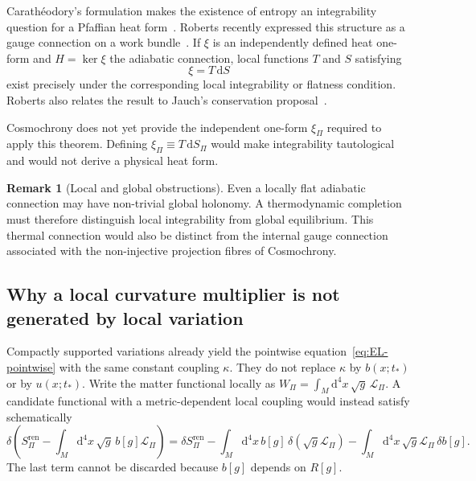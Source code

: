 \documentclass[12pt,a4paper]{article}
\theoremstyle{definition}
\newtheorem{remark}[theorem]{Remark}
\newcommand{\Spi}{S_{\Pi}}
\newcommand{\dd}{\mathrm{d}}
\begin{document}
      Carath\'{e}odory's formulation makes the existence of entropy an integrability question for a Pfaffian heat
      form~\cite{Caratheodory1909}.
      Roberts recently expressed this structure as a gauge connection on a work bundle~\cite{Roberts2026Heat}.
      If $\xi$ is an independently defined heat one-form and $H=\ker\xi$ the adiabatic connection, local functions
      $T$ and $S$ satisfying
      \begin{equation}
        \xi=T\,\dd S
        \label{eq:delta-E-Pi}
      \end{equation}
      exist precisely under the corresponding local integrability or flatness condition.
      Roberts also relates the result to Jauch's conservation proposal~\cite{Jauch1972,Roberts2026Origin}.

      Cosmochrony does not yet provide the independent one-form $\xi_\Pi$ required to apply this theorem.
      Defining $\xi_\Pi\equiv T\,\dd\Spi$ would make integrability tautological and would not derive a physical heat
      form.

      \begin{remark}[Local and global obstructions]
        \label{rem:identity-nature}
        Even a locally flat adiabatic connection may have non-trivial global holonomy.
        A thermodynamic completion must therefore distinguish local integrability from global equilibrium.
        This thermal connection would also be distinct from the internal gauge connection associated with the
        non-injective projection fibres of Cosmochrony.
      \end{remark}

    \subsection{Why a local curvature multiplier is not generated by local variation}

      Compactly supported variations already yield the pointwise equation~\eqref{eq:EL-pointwise} with the same
      constant coupling $\kappa$.
      They do not replace $\kappa$ by $b(x;t_*)$ or by $u(x;t_*)$.
      Write the matter functional locally as
      $W_\Pi=\int_M\dd^4x\,\sqrt{g}\,\mathcal{L}_\Pi$.
      A candidate functional with a metric-dependent local coupling would instead satisfy schematically
      \begin{equation}
        \delta\!\left(
          \Spi^{\mathrm{ren}}
          -\int_M\dd^4x\,\sqrt{g}\,b[g]\mathcal{L}_\Pi
        \right)
        =\delta\Spi^{\mathrm{ren}}
        -\int_M\dd^4x\,b[g]\,\delta\!\left(\sqrt{g}\mathcal{L}_\Pi\right)
        -\int_M\dd^4x\,\sqrt{g}\mathcal{L}_\Pi\,\delta b[g].
        \label{eq:local-einstein}
      \end{equation}
      The last term cannot be discarded because $b[g]$ depends on $R[g]$.
\end{document}
